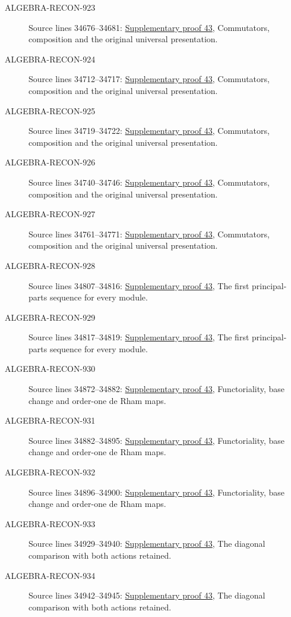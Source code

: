 \begin{description}
\item[ALGEBRA-RECON-923] Source lines 34676--34681: \hyperlink{algebra_diff_operators_notes_20260928}{Supplementary proof 43}, Commutators, composition and the original universal presentation.
\item[ALGEBRA-RECON-924] Source lines 34712--34717: \hyperlink{algebra_diff_operators_notes_20260928}{Supplementary proof 43}, Commutators, composition and the original universal presentation.
\item[ALGEBRA-RECON-925] Source lines 34719--34722: \hyperlink{algebra_diff_operators_notes_20260928}{Supplementary proof 43}, Commutators, composition and the original universal presentation.
\item[ALGEBRA-RECON-926] Source lines 34740--34746: \hyperlink{algebra_diff_operators_notes_20260928}{Supplementary proof 43}, Commutators, composition and the original universal presentation.
\item[ALGEBRA-RECON-927] Source lines 34761--34771: \hyperlink{algebra_diff_operators_notes_20260928}{Supplementary proof 43}, Commutators, composition and the original universal presentation.
\item[ALGEBRA-RECON-928] Source lines 34807--34816: \hyperlink{algebra_diff_operators_notes_20260928}{Supplementary proof 43}, The first principal-parts sequence for every module.
\item[ALGEBRA-RECON-929] Source lines 34817--34819: \hyperlink{algebra_diff_operators_notes_20260928}{Supplementary proof 43}, The first principal-parts sequence for every module.
\item[ALGEBRA-RECON-930] Source lines 34872--34882: \hyperlink{algebra_diff_operators_notes_20260928}{Supplementary proof 43}, Functoriality, base change and order-one de Rham maps.
\item[ALGEBRA-RECON-931] Source lines 34882--34895: \hyperlink{algebra_diff_operators_notes_20260928}{Supplementary proof 43}, Functoriality, base change and order-one de Rham maps.
\item[ALGEBRA-RECON-932] Source lines 34896--34900: \hyperlink{algebra_diff_operators_notes_20260928}{Supplementary proof 43}, Functoriality, base change and order-one de Rham maps.
\item[ALGEBRA-RECON-933] Source lines 34929--34940: \hyperlink{algebra_diff_operators_notes_20260928}{Supplementary proof 43}, The diagonal comparison with both actions retained.
\item[ALGEBRA-RECON-934] Source lines 34942--34945: \hyperlink{algebra_diff_operators_notes_20260928}{Supplementary proof 43}, The diagonal comparison with both actions retained.

\end{description}
